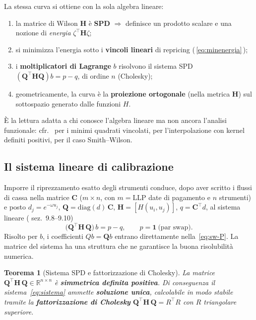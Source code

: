 \documentclass[11pt,a4paper]{article}
\theoremstyle{plain}
\newtheorem{teorema}{Teorema}[section]
\theoremstyle{definition}
\theoremstyle{remark}
\newcommand{\LLP}{\ensuremath{\mathrm{LLP}}}
\newcommand{\Qmat}{\mathbf{Q}}
\newcommand{\Hmat}{\mathbf{H}}
\newcommand{\transp}{^{\!\top}}
\begin{document}
\begin{keybox}
La stessa curva si ottiene con la sola algebra lineare:
\begin{enumerate}
  \item la matrice di Wilson $\Hmat$ \`e \textbf{SPD} $\Rightarrow$ definisce un prodotto
        scalare e una nozione di \emph{energia} $\zeta\transp\Hmat\zeta$;
  \item si minimizza l'energia sotto i \textbf{vincoli lineari} di repricing
        (\,\eqref{eq:minenergia}\,);
  \item i \textbf{moltiplicatori di Lagrange} $b$ risolvono il sistema SPD
        $(\Qmat\transp\Hmat\Qmat)b = p-q$, di ordine $n$ (Cholesky);
  \item geometricamente, la curva \`e la \textbf{proiezione ortogonale} (nella metrica
        $\Hmat$) sul sottospazio generato dalle funzioni $H$.
\end{enumerate}
\`E la lettura adatta a chi conosce l'algebra lineare ma non ancora l'analisi funzionale:
cfr.\ \cite{boyd2018} per i minimi quadrati vincolati, \cite{fasshauer2007} per
l'interpolazione con kernel definiti positivi, \cite{lageras2016} per il caso Smith--Wilson.
\end{keybox}

\subsection{Il sistema lineare di calibrazione}

Imporre il riprezzamento esatto degli strumenti conduce, dopo aver scritto i flussi di cassa
nella matrice $\mathbf{C}$ ($m\times n$, con $m=\LLP$ date di pagamento e $n$ strumenti) e
posto $d_j = e^{-\omega u_j}$, $\Qmat = \mathrm{diag}(d)\,\mathbf{C}$,
$\Hmat = [H(u_i,u_j)]$, $q = \mathbf{C}\transp d$, al sistema lineare
(\cite{eiopa2025} sez.~9.8--9.10)
\begin{equation}
  \bigl(\Qmat\transp \Hmat\, \Qmat\bigr)\, b = p - q,
  \qquad p = \mathbf{1}\ \text{(par swap)} .
  \label{eq:sistema}
\end{equation}
Risolto per $b$, i coefficienti $Qb = \Qmat b$ entrano direttamente
nella~\eqref{eq:sw-P}. La matrice del sistema ha una struttura che ne garantisce la buona
risolubilit\`a numerica.

\begin{teorema}[Sistema SPD e fattorizzazione di Cholesky]
\label{thm:spd}
La matrice $\Qmat\transp \Hmat\, \Qmat \in \mathbb{R}^{n\times n}$ \`e \textbf{simmetrica
definita positiva}. Di conseguenza il sistema~\eqref{eq:sistema} ammette \textbf{soluzione
unica}, calcolabile in modo stabile tramite la \textbf{fattorizzazione di Cholesky}
$\Qmat\transp \Hmat\,\Qmat = R\transp R$ con $R$ triangolare superiore.
\end{teorema}
\end{document}

